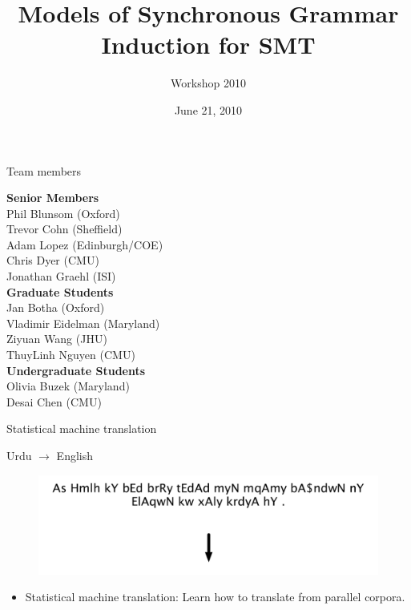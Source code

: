 \documentclass{beamer}
\title[Models of SCFG Induction]{Models of Synchronous Grammar Induction for SMT}
\author[CLSP Workshop 2010]{
  Workshop 2010
}
\institute[Baltimore]{
  The Center for Speech and Language Processing \\ Johns Hopkins University
}
\date[June 21]{June 21, 2010}
\begin{document}
\begin{frame}
  \titlepage
\end{frame}

 


\begin{frame}[t]{Team members}
\begin{center}
{\bf Senior Members} \\
  Phil Blunsom (Oxford)\\
  Trevor Cohn (Sheffield)\\
  Adam Lopez (Edinburgh/COE)\\
  Chris Dyer (CMU)\\
  Jonathan Graehl (ISI)\\
\vspace{0.2in}
{\bf Graduate Students} \\
  Jan Botha (Oxford) \\
  Vladimir Eidelman (Maryland) \\
  Ziyuan Wang (JHU) \\
  ThuyLinh Nguyen (CMU) \\
\vspace{0.2in}
{\bf Undergraduate Students} \\
  Olivia Buzek (Maryland) \\
  Desai Chen (CMU) \\
\end{center}
\end{frame}



\begin{frame}[t]{Statistical machine translation}
\begin{exampleblock}{Urdu $\rightarrow$ English}
  \begin{figure}
    {\centering \includegraphics[scale=0.55]{urdu-bw.pdf}}
  \end{figure}
\vspace{0.10cm}
\end{exampleblock}
\begin{itemize}
  \item Statistical machine translation: Learn how to translate from parallel corpora.
\end{itemize}
\end{frame}
\end{document}
